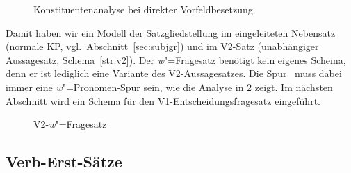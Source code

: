 \begin{figure}
  \centering
  \vspace{0.3cm}
  \caption{Konstituentenanalyse bei direkter Vorfeldbesetzung}
  \label{fig:vorfelddirektbesetzung}
\end{figure}

Damit haben wir ein Modell der Satzgliedstellung im eingeleiteten Nebensatz (normale KP, vgl.\ Abschnitt~\ref{sec:subjgr}) und im V2-Satz (unabhängiger Aussagesatz, Schema~\ref{str:v2}).
Der \textit{w}"=Fragesatz benötigt kein eigenes Schema, denn er ist lediglich eine Variante des V2-Aussagesatzes.
Die Spur \Tii\ muss dabei immer eine \textit{w}"=Pronomen-Spur sein, wie die Analyse in \ref{fig:v2fragesatz} zeigt.
Im nächsten Abschnitt wird ein Schema für den V1-Entscheidungsfragesatz eingeführt.

\begin{figure}
  \centering
  \vspace{0.3cm}
  \caption{V2-\textit{w}"=Fragesatz}
  \label{fig:v2fragesatz}
\end{figure}


\subsection{Verb-Erst-Sätze}

